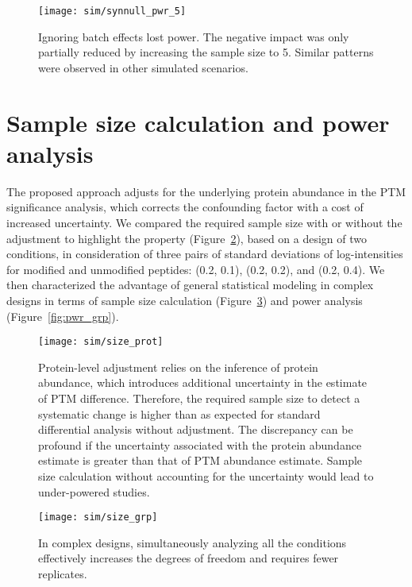 \documentclass{mcp}
\def\sfigref#1{{Figure~\ref{#1}}}
\begin{document}
\begin{figure}[h!]
\centering
\texttt{[image: sim/synnull\_pwr\_5]}
\caption{Ignoring batch effects lost power. The negative impact was only partially reduced by increasing the sample size to 5. Similar patterns were observed in other simulated scenarios. \label{fig:synnull_pwr_5}}
\end{figure}


\clearpage
\section{Sample size calculation and power analysis}

The proposed approach adjusts for the underlying protein abundance in the PTM significance analysis, which corrects the confounding factor with a cost of increased uncertainty. We compared the required sample size with or without the adjustment to highlight the property (\sfigref{fig:size_prot}), based on a design of two conditions, in consideration of three pairs of standard deviations of log-intensities for modified and unmodified peptides: (0.2, 0.1), (0.2, 0.2), and (0.2, 0.4). 
We then characterized the advantage of general statistical modeling in complex designs in terms of sample size calculation (\sfigref{fig:size_grp}) and power analysis (\sfigref{fig:pwr_grp}). 

\begin{figure}[h!]
\centering
\texttt{[image: sim/size\_prot]}
\caption{Protein-level adjustment relies on the inference of protein abundance, which introduces additional uncertainty in the estimate of PTM difference. Therefore, the required sample size to detect a systematic change is higher than as expected for standard differential analysis without adjustment. The discrepancy can be profound if the uncertainty associated with the protein abundance estimate is greater than that of PTM abundance estimate. Sample size calculation without accounting for the uncertainty would lead to under-powered studies. \label{fig:size_prot}}
\end{figure}

\begin{figure}[h!]
\centering
\texttt{[image: sim/size\_grp]}
\caption{In complex designs, simultaneously analyzing all the conditions effectively increases the degrees of freedom and requires fewer replicates. \label{fig:size_grp}}
\end{figure}
\end{document}
